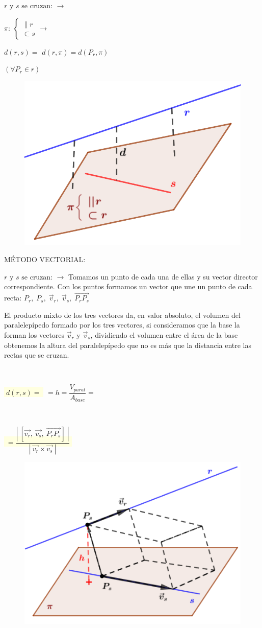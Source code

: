 \begin{multicols}{2}
\noindent $r \text{ y } s \text{ se cruzan: } \to $

\noindent $\pi:\  \begin{cases} \parallel r \\ \subset s \end{cases}  \to $

\noindent $d(r,s)=$ $d(r,\pi)=d(P_r,\pi)$ 

\noindent $(\forall P_r \in r)$

	\begin{figure}[H]
		\centering
		\includegraphics[width=.45\textwidth]{imagenes/imagenes11/T11IM22.png}
	\end{figure}
\end{multicols}

\noindent MÉTODO VECTORIAL:

\noindent $r \text{ y } s \text{ se cruzan: } \to $ Tomamos un punto de cada una de ellas y su vector director correspondiente. Con los puntos formamos un vector que une un punto de cada recta: $P_r,\;P_s,\; \vec v_r,\; \vec v_s,\; \overrightarrow{P_rP_s}$ 

\noindent El producto mixto de los tres vectores da, en valor absoluto, el volumen del paralelepípedo formado por los tres vectores, si consideramos que la base la forman los vectores  $ \vec v_r$ y $\vec v_s$, dividiendo el volumen entre el área de la base obtenemos la altura del paralelepípedo que no es más que la distancia entre las rectas que se cruzan.


\begin{multicols}{2}
$\quad$

\noindent  \colorbox{LightYellow}{$\boxed{\;d(r,s)=\;}$} $=h=\dfrac {V_{paral}}{A_{base}}=$

$\quad$
			
\noindent \colorbox{LightYellow}{$\boxed{\;=\dfrac{|\ [\vec{v_r},\ \vec{v_{s}},\ \overrightarrow{P_rP_s}]\ |}{|\ \vec{v_r} \times \vec{v_s} \ |}\;}$}

	\begin{figure}[H]
		\centering
		\includegraphics[width=.45\textwidth]{imagenes/imagenes11/T11IM21.png}
	\end{figure}
\end{multicols}


